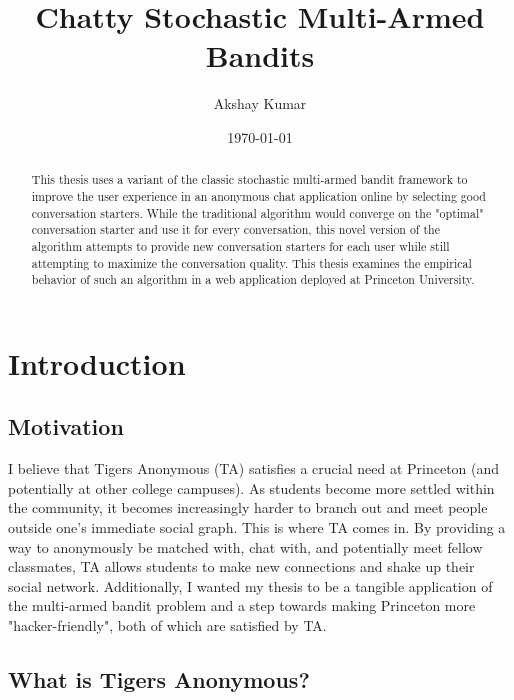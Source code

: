 \documentclass{report}
\begin{document}
\title{Chatty Stochastic Multi-Armed Bandits}
\author{Akshay Kumar}
\date{\today}
\maketitle

\begin{abstract}

This thesis uses a variant of the classic stochastic multi-armed bandit framework to improve the  user experience in an anonymous chat application online by selecting good conversation starters. While the traditional algorithm would converge on the "optimal" conversation starter and use it for every conversation, this novel version of the algorithm attempts to provide new conversation starters for each user while still attempting to maximize the conversation quality. This thesis examines the empirical behavior of such an algorithm in a web application deployed at Princeton University.

\end{abstract}

\tableofcontents
\newpage

\chapter{Introduction}

\section{Motivation}

I believe that Tigers Anonymous (TA) satisfies a crucial need at Princeton (and potentially at other college campuses). As students become more settled within the community, it becomes increasingly harder to branch out and meet people outside one's immediate social graph. This is where TA comes in. By providing a way to anonymously be matched with, chat with, and potentially meet fellow classmates, TA allows students to make new connections and shake up their social network. Additionally, I wanted my thesis to be a tangible application of the multi-armed bandit problem and a step towards making Princeton more "hacker-friendly", both of which are satisfied by TA.

\section{What is Tigers Anonymous?}
\end{document}
